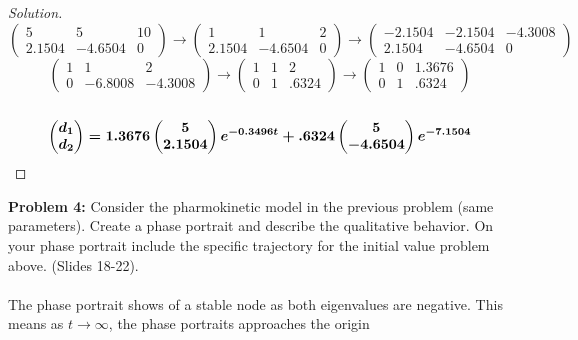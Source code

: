 \documentclass[12pt]{article}
\begin{document}
\begin{proof}[Solution]
$$\begin{pmatrix}
			5 & 5 & 10\\
			2.1504 & -4.6504 & 0
		\end{pmatrix} \rightarrow
		\begin{pmatrix}
			1 & 1 & 2 \\
			2.1504 & -4.6504 & 0
		\end{pmatrix} \rightarrow
		\begin{pmatrix}
			-2.1504 & -2.1504 & -4.3008 \\
			2.1504 & -4.6504 & 0
		\end{pmatrix}
		$$
		$$
		\begin{pmatrix}
			1 & 1 & 2 \\
			0 & -6.8008 & -4.3008
		\end{pmatrix} \rightarrow
		\begin{pmatrix}
			1 & 1 & 2 \\
			0 & 1 & .6324
		\end{pmatrix} \rightarrow
		\begin{pmatrix}
			1 & 0 & 1.3676 \\
			0 & 1 & .6324
		\end{pmatrix} 
		$$
		\\
		$$
		\boldmath
		\begin{pmatrix}
		d_1 \\
		d_2
		\end{pmatrix} = 
		1.3676
		\begin{pmatrix}
		5 \\
		2.1504
		\end{pmatrix} 
		e^{-0.3496t} + 
		.6324
		\begin{pmatrix}
		5 \\
		-4.6504
		\end{pmatrix}
		e^{-7.1504}
		$$
\end{proof}
\vspace{\baselineskip}
\noindent \textbf{Problem 4: }Consider the pharmokinetic model in the previous problem (same parameters). Create a
phase portrait and describe the qualitative behavior. On your phase portrait include the specific
trajectory for the initial value problem above. (Slides 18-22).
\\ \\
The phase portrait shows of a stable node as both eigenvalues are negative.  This means as $t \rightarrow \infty$, the phase portraits approaches the origin
\end{document}
